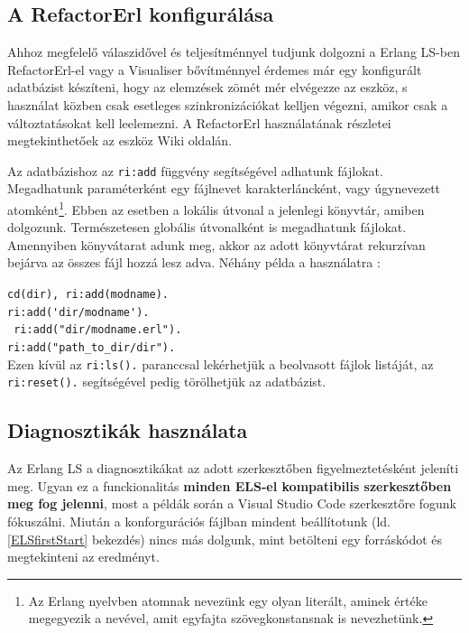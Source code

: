 \subsection{A RefactorErl konfigurálása} \label{referlConfig}

Ahhoz megfelelő válaszidővel és teljesítménnyel tudjunk dolgozni a Erlang LS-ben RefactorErl-el vagy a Visualiser bővítménnyel érdemes már egy konfigurált adatbázist készíteni, hogy az elemzések zömét mér elvégezze az eszköz, s használat közben csak esetleges szinkronizációkat kelljen végezni, amikor csak a változtatásokat kell leelemezni. A RefactorErl használatának részletei megtekinthetőek az eszköz Wiki oldalán. \cite{referlWiki}

Az adatbázishoz az \lstinline{ri:add} függvény segítségével adhatunk fájlokat. Megadhatunk paraméterként egy fájlnevet karakterláncként, vagy úgynevezett atomként\footnote{Az Erlang nyelvben atomnak nevezünk egy olyan literált, aminek értéke megegyezik a nevével, amit egyfajta szövegkonstansnak is nevezhetünk.}. Ebben az esetben a lokális útvonal a jelenlegi könyvtár, amiben dolgozunk. Természetesen globális útvonalként is megadhatunk fájlokat. Amennyiben könyvátarat adunk meg, akkor az adott könyvtárat rekurzívan bejárva az összes fájl hozzá lesz adva. Néhány példa a használatra \cite{referlWikiFileManagement}:

\noindent \lstinline{cd(dir), ri:add(modname).}\\
\noindent \lstinline{ri:add('dir/modname').}\\
\noindent \lstinline{ ri:add("dir/modname.erl").}\\
\noindent \lstinline{ri:add("path_to_dir/dir").}\\

Ezen kívül az \lstinline{ri:ls().} paranccsal lekérhetjük a beolvasott fájlok listáját, az \lstinline{ri:reset().} segítségével pedig törölhetjük az adatbázist.


\subsection{Diagnosztikák használata}
Az Erlang LS a diagnosztikákat az adott szerkesztőben figyelmeztetésként jeleníti meg. Ugyan ez a funckionalitás \textbf{minden ELS-el kompatibilis szerkesztőben meg fog jelenni}, most a példák során a Visual Studio Code szerkesztőre fogunk fókuszálni. Miután a konforgurációs fájlban mindent beállítotunk (ld. \ref{ELSfirstStart} bekezdés) nincs más dolgunk, mint betölteni egy forráskódot és megtekinteni az eredményt.


